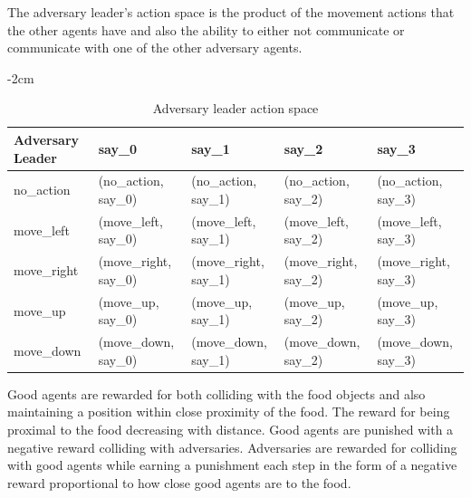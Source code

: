 \documentclass{article}
\begin{document}
  The adversary leader's action space is the product of the movement actions that the other agents have and also the ability to either not communicate or communicate with one of the other adversary agents.

\begin{table}[!ht]
  \centering
  \addtolength{\leftskip} {-2cm}
  \addtolength{\rightskip}{-2cm}
  \begin{tabular}{|l|l|l|l|l|}
    \hline
    Adversary Leader  & say\_0                & say\_1                & say\_2                & say\_3                \\ \hline
    no\_action  & (no\_action, say\_0)  & (no\_action, say\_1)  & (no\_action, say\_2)  & (no\_action, say\_3)  \\ \hline
    move\_left  & (move\_left, say\_0)  & (move\_left, say\_1)  & (move\_left, say\_2)  & (move\_left, say\_3)  \\ \hline
    move\_right & (move\_right, say\_0) & (move\_right, say\_1) & (move\_right, say\_2) & (move\_right, say\_3) \\ \hline
    move\_up    & (move\_up, say\_0)    & (move\_up, say\_1)    & (move\_up, say\_2)    & (move\_up, say\_3)    \\ \hline
    move\_down  & (move\_down, say\_0)  & (move\_down, say\_1)  & (move\_down, say\_2)  & (move\_down, say\_3)  \\ \hline
    \end{tabular}
    \caption{Adversary leader action space}
    \label{tab:adversary-leader-action}
  \end{table}

  Good agents are rewarded for both colliding with the food objects and also maintaining a position within close proximity of the food.
  The reward for being proximal to the food decreasing with distance.
  Good agents are punished with a negative reward colliding with adversaries.
  Adversaries are rewarded for colliding with good agents while earning a punishment each step in the form of a negative reward proportional to how close good agents are to the food.
\end{document}
